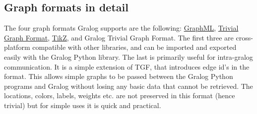 \documentclass{article}
\newlength\q
\begin{document}
\subsection{Graph formats in detail}
\label{graphFormatsInDetail}
The four graph formats Gralog supports are the following: \href{https://en.wikipedia.org/wiki/GraphML}{GraphML}, \href{https://en.wikipedia.org/wiki/Trivial\_Graph\_Format}{Trivial Graph Format}, \href{https://en.wikipedia.org/wiki/PGF/TikZ}{TikZ}, and Gralog Trivial Graph Format. The first three are cross-platform compatible with other libraries, and can be imported and exported easily with the Gralog Python library. The last is primarily useful for intra-gralog communication. It is a simple extension of TGF, that introduces edge id's in the format. This allows simple graphs to be passed between the Gralog Python programs and Gralog without losing any basic data that cannot be retrieved. The locations, colors, labels, weights etc. are not preserved in this format (hence trivial) but for simple uses it is quick and practical.
\end{document}
